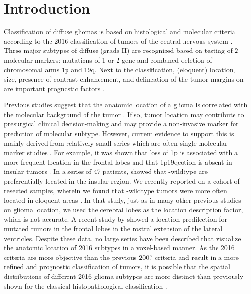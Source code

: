 \section{Introduction}
Classification of diffuse gliomas is based on histological and molecular criteria according to the 2016  classification of \glspl{tumor} of the central nervous system \autocite{louis2014international}.
Three major subtypes of diffuse  (grade II)  are recognized based on testing of 2 molecular markers: mutations of  1 or 2 gene and combined deletion of chromosomal arms 1p and 19q.
Next to the  classification, (eloquent) location, size, presence of contrast enhancement, and delineation of the \gls{tumor} margins on  are important prognostic factors \autocite{pignatti2002prognostic, jakola2012low, capelle2013spontaneous, chang2008preoperative}.

Previous studies suggest that the anatomic location of a glioma is correlated with the molecular background of the \gls{tumor} \autocite{stockhammer2012idh1, goze2009lack, laigle2004correlations, metellus2010absence}.
If so, \gls{tumor} location may contribute to presurgical clinical decision-making and may provide a non-invasive marker for prediction of molecular subtype.
However, current evidence to support this is mainly derived from relatively small series which are often single molecular marker studies  \autocite{stockhammer2012idh1, goze2009lack, laigle2004correlations, metellus2010absence}.
For example, it was shown that loss of 1p is associated with a more frequent location in the frontal lobes and that \acl{1p19qcotion} is absent in insular \glspl{tumor} \autocite{goze2009lack, laigle2004correlations}.
In a series of 47 patients,  showed that -wildtype  are preferentially located in the insular region.
We recently reported on a cohort of resected  samples, wherein we found that -wildtype \glspl{tumor} were more often located in eloquent areas \autocite{wijnenga2017impact}.
In that study, just as in many other previous studies on glioma location, we used the cerebral lobes as the location description factor, which is not accurate.
A recent study by  showed a location predilection for -mutated \glspl{tumor} in the frontal lobes in the rostral extension of the lateral ventricles.
Despite these data, no large series have been described that visualize the anatomic location of  2016  subtypes in a voxel-based manner.
As the  2016 criteria are more objective than the previous  2007 criteria and result in a more refined and prognostic classification of \glspl{tumor}, it is possible that the spatial distributions of different  2016 glioma subtypes are more distinct than previously shown for the classical histopathological classification \autocite{larjavaara2007incidence}.

